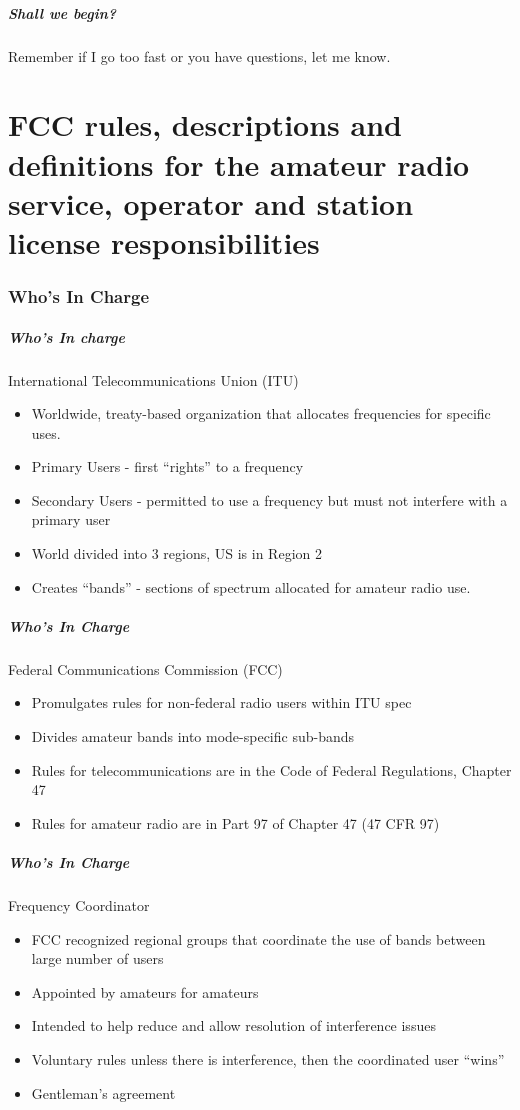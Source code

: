 \documentclass[10pt]{beamer}
\begin{document}
\begin{frame}
\frametitle{Shall we begin?}
Remember if I go too fast or you have questions, let me know.
\end{frame}

\part{FCC rules, descriptions and definitions for the amateur radio service, operator and station license responsibilities}
\section{Who's In Charge}
\begin{frame}
\frametitle{Who's In charge}
International Telecommunications Union (ITU)
\begin{itemize}
\item Worldwide, treaty-based organization that allocates frequencies for specific uses.
\item Primary Users - first ``rights'' to a frequency
\item Secondary Users - permitted to use a frequency but must not interfere with a primary user
\item World divided into 3 regions, US is in Region 2
\item Creates ``bands'' - sections of spectrum allocated for amateur radio use.
\end{itemize}
\end{frame}

\begin{frame}
\frametitle{Who's In Charge}
Federal Communications Commission (FCC)
\begin{itemize}
\item Promulgates rules for non-federal radio users within ITU spec
\item Divides amateur bands into mode-specific sub-bands
\item Rules for telecommunications are in the Code of Federal Regulations, Chapter 47
\item Rules for amateur radio are in Part 97 of Chapter 47 (47 CFR 97)
\end{itemize}
\end{frame}

\begin{frame}
\frametitle{Who's In Charge}
Frequency Coordinator
\begin{itemize}
\item FCC recognized regional groups that coordinate the use of bands between large number of users \pause
\item Appointed by amateurs for amateurs \pause
\item Intended to help reduce and allow resolution of interference issues \pause
\item Voluntary rules unless there is interference, then the coordinated user ``wins''\pause
\item Gentleman's agreement
\end{itemize}
\end{frame}
\end{document}
